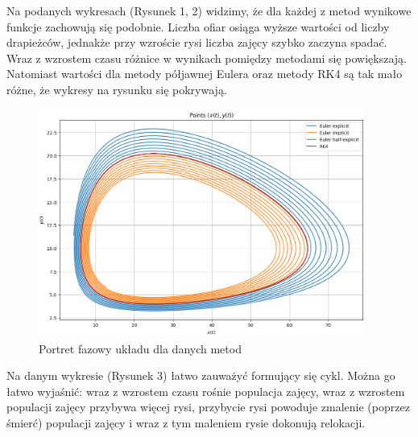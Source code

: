 \documentclass{article}
\begin{document}
Na podanych wykresach (Rysunek 1, 2) widzimy, że dla każdej z metod wynikowe funkcje zachowują się podobnie. Liczba ofiar osiąga wyższe wartości od liczby drapieżców, jednakże przy wzroście rysi liczba zajęcy szybko zaczyna spadać. Wraz z wzrostem czasu różnice w wynikach pomiędzy metodami się powiększają. Natomiast wartości dla metody półjawnej Eulera oraz metody RK4 są tak mało różne, że wykresy na rysunku się pokrywają.
\begin{figure}[H]
    \centering
    \includegraphics[width=0.95\textwidth]{2}
    \caption{Portret fazowy układu dla danych metod}
    \label{fig:mesh}
\end{figure}
Na danym wykresie (Rysunek 3) łatwo zauważyć formujący się cykl. Można go łatwo wyjaśnić: wraz z wzrostem czasu rośnie populacja zajęcy, wraz z wzrostem populacji zajęcy przybywa więcej rysi, przybycie rysi powoduje zmalenie (poprzez śmierć) populacji zajęcy i wraz z tym maleniem rysie dokonują relokacji.
\end{document}

